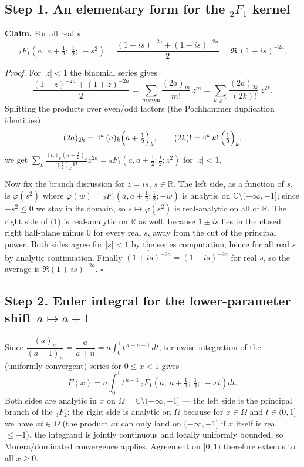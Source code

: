 \documentclass[11pt]{article}
\theoremstyle{remark}
\begin{document}
\subsection*{Step 1. An elementary form for the ${}_2F_1$ kernel}

\textbf{Claim.} For all real $s$,
\begin{equation}
{}_2F_1\!\left(a,\ a+\tfrac12;\ \tfrac12;\ -s^2\right)
=\frac{(1+is)^{-2a}+(1-is)^{-2a}}{2}=\Re\,(1+is)^{-2a}. \tag{1}
\end{equation}

\emph{Proof.} For $|z|<1$ the binomial series gives
$$\frac{(1-z)^{-2a}+(1+z)^{-2a}}{2}=\sum_{m\ \mathrm{even}}\frac{(2a)_m}{m!}\,z^{m}=\sum_{k\ge0}\frac{(2a)_{2k}}{(2k)!}\,z^{2k}.$$
Splitting the products over even/odd factors (the Pochhammer duplication identities)
$$(2a)_{2k}=4^k\,(a)_k\Bigl(a+\tfrac12\Bigr)_k,\qquad (2k)!=4^k\,k!\,\Bigl(\tfrac12\Bigr)_k,$$
we get $\sum_k \frac{(a)_k(a+\frac12)_k}{(\frac12)_k\,k!}z^{2k}={}_2F_1(a,a+\tfrac12;\tfrac12;z^2)$ for $|z|<1$.

Now fix the branch discussion for $z=is$, $s\in\mathbb R$. The left side, as a function of $s$, is $\varphi(s^2)$ where $\varphi(w)={}_2F_1(a,a+\tfrac12;\tfrac12;-w)$ is analytic on $\mathbb C\setminus(-\infty,-1]$; since $-s^2\le 0$ we stay in its domain, so $s\mapsto\varphi(s^2)$ is real-analytic on all of $\mathbb R$. The right side of (1) is real-analytic on $\mathbb R$ as well, because $1\pm is$ lies in the closed right half-plane minus $0$ for every real $s$, away from the cut of the principal power. Both sides agree for $|s|<1$ by the series computation, hence for all real $s$ by analytic continuation. Finally $\overline{(1+is)^{-2a}}=(1-is)^{-2a}$ for real $s$, so the average is $\Re(1+is)^{-2a}$. $\square$

\subsection*{Step 2. Euler integral for the lower-parameter shift $a\mapsto a+1$}

Since $\dfrac{(a)_n}{(a+1)_n}=\dfrac{a}{a+n}=a\displaystyle\int_0^1 t^{\,a+n-1}\,dt$, termwise integration of the (uniformly convergent) series for $0\le x<1$ gives
$$F(x)=a\int_0^1 t^{\,a-1}\,{}_2F_1\!\left(a,\ a+\tfrac12;\ \tfrac12;\ -xt\right)dt .$$
Both sides are analytic in $x$ on $\Omega=\mathbb C\setminus(-\infty,-1]$ — the left side is the principal branch of the ${}_3F_2$; the right side is analytic on $\Omega$ because for $x\in\Omega$ and $t\in(0,1]$ we have $xt\in\Omega$ (the product $xt$ can only land on $(-\infty,-1]$ if $x$ itself is real $\le-1$), the integrand is jointly continuous and locally uniformly bounded, so Morera/dominated convergence applies. Agreement on $[0,1)$ therefore extends to all $x\ge0$.
\end{document}
